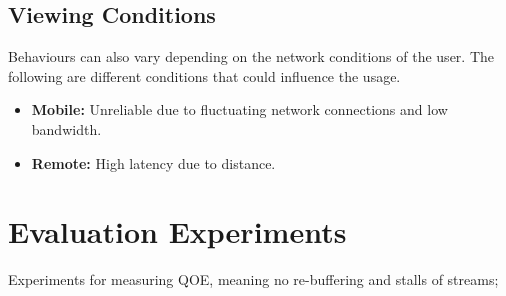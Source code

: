 \subsection{Viewing Conditions}
\label{sec:viewing-conmditions}
Behaviours can also vary depending on the network conditions of the user. The following are different conditions that could influence the usage.
\begin{itemize}
    \item \textbf{Mobile:}
    Unreliable due to fluctuating network connections and low bandwidth.
    \item \textbf{Remote:}
    High latency due to distance.
\end{itemize}


\section{Evaluation Experiments}
Experiments for measuring \ac{QOE}, meaning no re-buffering and stalls of streams;
